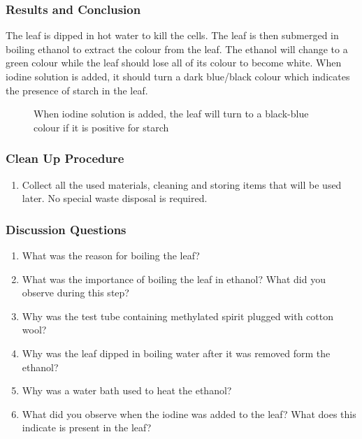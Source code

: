 \subsubsection*{Results and Conclusion}
The leaf is dipped in hot water to kill the cells. The leaf is then submerged in boiling ethanol to extract the colour from the leaf. The ethanol will change to a green colour while the leaf should lose all of its colour to become white. When iodine solution is added, it should turn a dark blue/black colour which indicates the presence of starch in the leaf.

\begin{figure}[h]
\begin{center}
\def\svgwidth{6cm}

\caption{When iodine solution is added, the leaf will turn to a black-blue colour if it is positive for starch}
\label{fig:starch}
\end{center}
\end{figure}

\subsubsection*{Clean Up Procedure}
\begin{enumerate}
\item{Collect all the used materials, cleaning and storing items that will be used later. No special waste disposal is required.}
\end{enumerate}

\subsubsection*{Discussion Questions}
\begin{enumerate}
\item{What was the reason for boiling the leaf?}
\item{What was the importance of boiling the leaf in ethanol? What did you observe during this step?}
\item{Why was the test tube containing methylated spirit plugged with cotton wool?}
\item{Why was the leaf dipped in boiling water after it was removed form the ethanol?}
\item{Why was a water bath used to heat the ethanol?}
\item{What did you observe when the iodine was added to the leaf? What does this indicate is present in the leaf?}
\end{enumerate}

